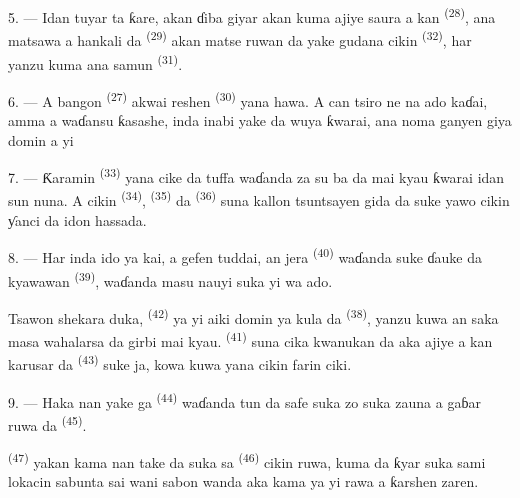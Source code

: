 5. --- Idan tuyar ta ƙare, akan ɗiba giyar akan kuma ajiye saura a kan
 \textsuperscript{(28)}, ana matsawa a hankali
da  \textsuperscript{(29)} akan matse ruwan da
yake gudana cikin  \textsuperscript{(32)}, har
yanzu kuma ana samun  \textsuperscript{(31)}.

\VUsaut{6.0mm}
\VUsaut{3.4mm}

6. --- A bangon  \textsuperscript{(27)} akwai
reshen  \textsuperscript{(30)} yana hawa. A can tsiro
ne na ado kaɗai, amma a waɗansu ƙasashe, inda inabi yake da wuya
ƙwarai, ana noma ganyen giya domin a yi 

7. --- Ƙaramin  \textsuperscript{(33)} yana cike
da tuffa waɗanda za su ba da  mai kyau ƙwarai idan
sun nuna. A cikin  \textsuperscript{(34)},
 \textsuperscript{(35)} da 
\textsuperscript{(36)} suna kallon tsuntsayen gida da suke yawo cikin
ƴanci da idon hassada.

8. --- Har inda ido ya kai, a gefen tuddai, an jera  \textsuperscript{(40)} waɗanda suke ɗauke da kyawawan
 \textsuperscript{(39)}, waɗanda
 masu nauyi suka yi wa ado.

Tsawon shekara duka,  \textsuperscript{(42)} ya
yi aiki domin ya kula da  \textsuperscript{(38)},
yanzu kuwa an saka masa wahalarsa da girbi mai kyau.  \textsuperscript{(41)} suna cika kwanukan da aka ajiye a
kan karusar da  \textsuperscript{(43)} suke ja, kowa
kuwa yana cikin farin ciki.

\VUsaut{5.0mm}
\VUsaut{3.4mm}

9. --- Haka nan yake ga 
\textsuperscript{(44)} waɗanda tun da safe suka zo suka zauna a gaɓar
ruwa da  \textsuperscript{(45)}.

 \textsuperscript{(47)} yakan kama  nan take
da suka sa  \textsuperscript{(46)} cikin ruwa, kuma da
ƙyar suka sami lokacin sabunta  sai wani sabon wanda aka
kama ya yi rawa a ƙarshen zaren.

